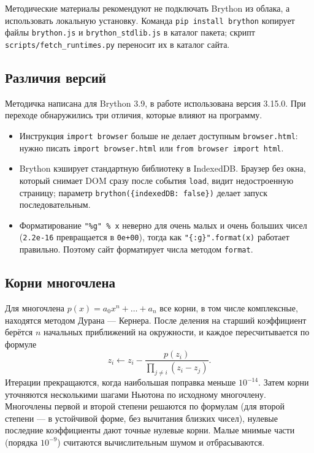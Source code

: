 \documentclass[14pt,a4paper]{extarticle}
\begin{document}
Методические материалы рекомендуют не подключать Brython из облака, а использовать
локальную установку. Команда \texttt{pip install brython} копирует файлы
\texttt{brython.js} и \texttt{brython\_stdlib.js} в каталог пакета; скрипт
\texttt{scripts/fetch\_runtimes.py} переносит их в каталог сайта.

\subsection{Различия версий}

Методичка написана для Brython 3.9, в работе использована версия 3.15.0. При переходе
обнаружились три отличия, которые влияют на программу.

\begin{itemize}
\item Инструкция \texttt{import browser} больше не делает доступным
\texttt{browser.html}: нужно писать \texttt{import browser.html} или
\texttt{from browser import html}.
\item Brython кэширует стандартную библиотеку в IndexedDB. Браузер без окна, который
снимает DOM сразу после события \texttt{load}, видит недостроенную страницу; параметр
\texttt{brython(\{indexedDB: false\})} делает запуск последовательным.
\item Форматирование \texttt{"\%g" \% x} неверно для очень малых и очень больших чисел
(\texttt{2.2e-16} превращается в \texttt{0e+00}), тогда как
\texttt{"\{:g\}".format(x)} работает правильно. Поэтому сайт форматирует числа методом
\texttt{format}.
\end{itemize}

\subsection{Корни многочлена}

Для многочлена $p(x)=a_0x^n+\dots+a_n$ все корни, в том числе комплексные, находятся
методом Дурана --- Кернера. После деления на старший коэффициент берётся $n$ начальных
приближений на окружности, и каждое пересчитывается по формуле
\[
z_i \leftarrow z_i-\frac{p(z_i)}{\prod_{j\ne i}(z_i-z_j)} .
\]
Итерации прекращаются, когда наибольшая поправка меньше $10^{-14}$. Затем корни
уточняются несколькими шагами Ньютона по исходному многочлену. Многочлены первой и
второй степени решаются по формулам (для второй степени --- в устойчивой форме, без
вычитания близких чисел), нулевые последние коэффициенты дают точные нулевые корни.
Малые мнимые части (порядка $10^{-9}$) считаются вычислительным шумом и отбрасываются.
\end{document}
